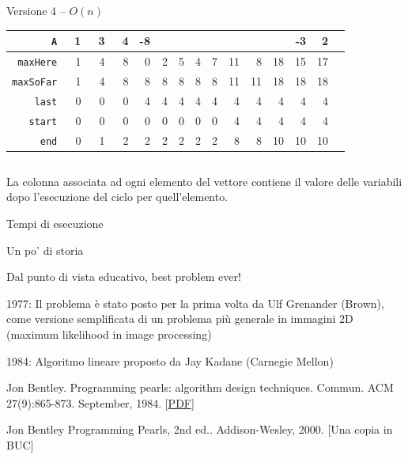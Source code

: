 \begin{frame}[fragile]{Versione 4  -- $O(n)$}

\small
\begin{tabular}{|r|r|r|r|r|r|r|r|r|r|r|r|r|r|r|}
\hline
       \texttt{A} & ~1 & ~3 & ~4 & -8 & ~\cellcolor{red!30}{2} & \cellcolor{red!30}{~3} & \cellcolor{red!30}{-1} & \cellcolor{red!30}{~3} & \cellcolor{red!30}{~4} & \cellcolor{red!30}{-3} & \cellcolor{red!30}{10} & -3 &  2 \\\hline\hline
 \texttt{maxHere} & 1 & 4 & 8 & 0 & 2 & 5 & 4 & 7 & 11 &  8 & 18 & 15 & 17 \\\hline
\texttt{maxSoFar} & 1 & 4 & 8 & 8 & 8 & 8 & 8 & 8 & 11 & 11 & 18 & 18 & 18 \\\hline
    \texttt{last} & 0 & 0 & 0 & 4 & 4 & 4 & 4 & 4 &  4 &  4 &  4 &  4 &  4 \\\hline
   \texttt{start} & 0 & 0 & 0 & 0 & 0 & 0 & 0 & 0 &  4 &  4 &  4 &  4 &  4 \\\hline
     \texttt{end} & 0 & 1 & 2 & 2 & 2 & 2 & 2 & 2 &  8 &  8 & 10 & 10 & 10 \\\hline
\end{tabular}


\begin{lstlisting}
\end{lstlisting}

\begingroup
\bigskip
La colonna associata ad ogni elemento del vettore contiene il valore
delle variabili dopo l'esecuzione del ciclo per quell'elemento.
\endgroup

\end{frame}

\begin{frame}{Tempi di esecuzione}
    
\end{frame}


\begin{frame}{Un po' di storia}

\vspace{-9pt}
\BIL
\item Dal punto di vista educativo, \alert{best problem ever}!
\item 1977: Il problema è stato posto per la prima volta da Ulf Grenander (Brown), come versione semplificata di un problema più generale in immagini 2D (maximum likelihood in image processing)
\item 1984: Algoritmo lineare proposto da Jay Kadane (Carnegie Mellon)
\item Jon Bentley. \alert{Programming pearls: algorithm design techniques}. Commun. ACM 27(9):865-873. September, 1984. [\href{http://cricca.disi.unitn.it/montresor/wp-content/uploads/2018/09/programmingpearls.pdf}{PDF}]
\item Jon Bentley \alert{Programming Pearls, 2nd ed.}. Addison-Wesley, 2000.
[Una copia in BUC]
\EIL

\end{frame}


